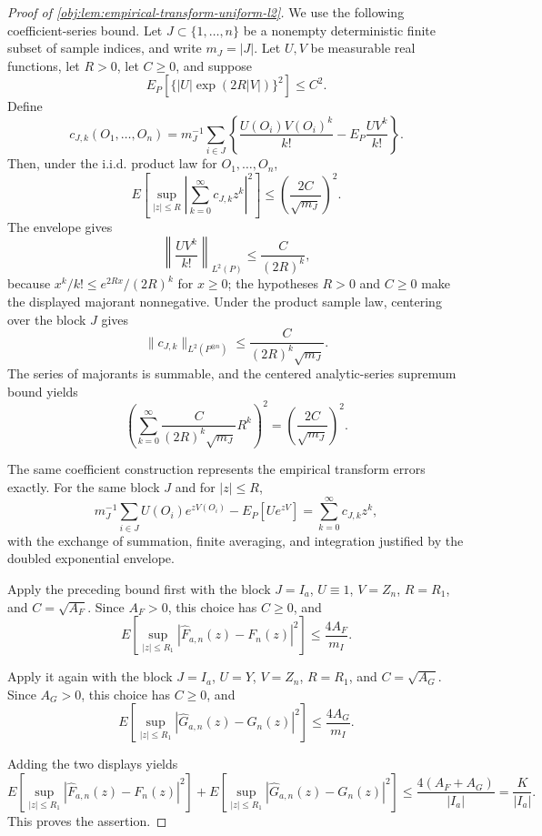 \begin{proof}[Proof of \cref{obj:lem:empirical-transform-uniform-l2}]
We use the following coefficient-series bound. Let \(J\subset\{1,\ldots,n\}\)
be a nonempty deterministic finite subset of sample indices, and write
\(m_J=|J|\). Let \(U,V\) be measurable real functions, let \(R>0\), let
\(C\ge0\), and suppose
\[
E_P\left[\{|U|\exp(2R|V|)\}^2\right]\le C^2.
\]
Define
\[
c_{J,k}(O_1,\ldots,O_n)
=
m_J^{-1}\sum_{i\in J}
\left\{
\frac{U(O_i)V(O_i)^k}{k!}
-
E_P\frac{UV^k}{k!}
\right\}.
\]
Then, under the i.i.d. product law for \(O_1,\ldots,O_n\),
\[
E\left[
\sup_{|z|\le R}
\left|\sum_{k=0}^{\infty} c_{J,k} z^k\right|^2
\right]
\le
\left(\frac{2C}{\sqrt{m_J}}\right)^2.
\]
The envelope gives
\[
\left\|
\frac{UV^k}{k!}
\right\|_{L^2(P)}
\le
\frac{C}{(2R)^k},
\]
because \(x^k/k!\le e^{2Rx}/(2R)^k\) for \(x\ge0\); the hypotheses
\(R>0\) and \(C\ge0\) make the displayed majorant nonnegative. Under the
product sample law, centering over the block \(J\) gives
\[
\|c_{J,k}\|_{L^2(P^{\otimes n})}
\le
\frac{C}{(2R)^k\sqrt{m_J}}.
\]
The series of majorants is summable, and the centered analytic-series supremum
bound yields
\[
\left(
\sum_{k=0}^{\infty}
\frac{C}{(2R)^k\sqrt{m_J}}R^k
\right)^2
=
\left(\frac{2C}{\sqrt{m_J}}\right)^2.
\]

The same coefficient construction represents the empirical transform errors
exactly. For the same block \(J\) and for \(|z|\le R\),
\[
m_J^{-1}\sum_{i\in J}U(O_i)e^{zV(O_i)}
-
E_P[Ue^{zV}]
=
\sum_{k=0}^{\infty}c_{J,k} z^k,
\]
with the exchange of summation, finite averaging, and integration justified by
the doubled exponential envelope. %

Apply the preceding bound first with the block \(J=I_a\), \(U\equiv1\),
\(V=Z_n\), \(R=R_1\), and \(C=\sqrt{A_F}\). Since \(A_F>0\), this choice has
\(C\ge0\), and
\[
E\left[
\sup_{|z|\le R_1}
|\widehat F_{a,n}(z)-F_n(z)|^2
\right]
\le
\frac{4A_F}{m_I}.
\]

Apply it again with the block \(J=I_a\), \(U=Y\), \(V=Z_n\), \(R=R_1\), and
\(C=\sqrt{A_G}\). Since \(A_G>0\), this choice has \(C\ge0\), and
\[
E\left[
\sup_{|z|\le R_1}
|\widehat G_{a,n}(z)-G_n(z)|^2
\right]
\le
\frac{4A_G}{m_I}.
\]

Adding the two displays yields
\[
E\left[\sup_{|z|\le R_1}|\widehat F_{a,n}(z)-F_n(z)|^2\right]
+
E\left[\sup_{|z|\le R_1}|\widehat G_{a,n}(z)-G_n(z)|^2\right]
\le
\frac{4(A_F+A_G)}{|I_a|}
=
\frac{K}{|I_a|}.
\]
This proves the assertion. %
\end{proof}

